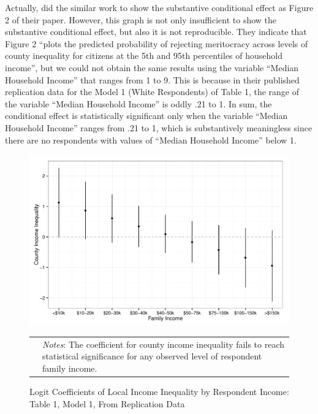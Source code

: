 Actually, \citet[334]{Newman2015a} did the similar work to show the substantive conditional effect as Figure 2 of their paper. However, this graph is not only insufficient to show the substantive conditional effect, but also it is not reproducible. They indicate that Figure 2 ``plots the predicted probability of rejecting meritocracy across levels of county inequality for citizens at the 5th and 95th percentiles of household income'', but we could not obtain the same results using the variable ``Median Household Income'' that ranges from 1 to 9. This is because in their published replication data for the Model 1 (White Respondents) of Table 1, the range of the variable ``Median Household Income'' is oddly .21 to 1. In sum, the conditional effect is statistically significant only when the variable ``Median Household Income'' ranges from .21 to 1, which is substantively meaningless since there are no respondents with values of ``Median Household Income'' below 1. 




\begin{figure}[htbp] 
  \caption{Logit Coefficients of Local Income Inequality by Respondent Income: Table 1, Model 1, From Replication Data}
  \label{F:coef.t1m1}
  \begin{center}
    \includegraphics[width=5.25in]{../figures/07_plot_interaction_terms_t1m1.pdf}
  \end{center}
  \begin{footnotesize}
  \begin{tabular}{p{.1in} p{5.1in}}
  & \emph{Notes}: The coefficient for county income inequality fails to reach statistical significance for any observed level of respondent family income.
  \end{tabular}
  \end{footnotesize}
\end{figure}


